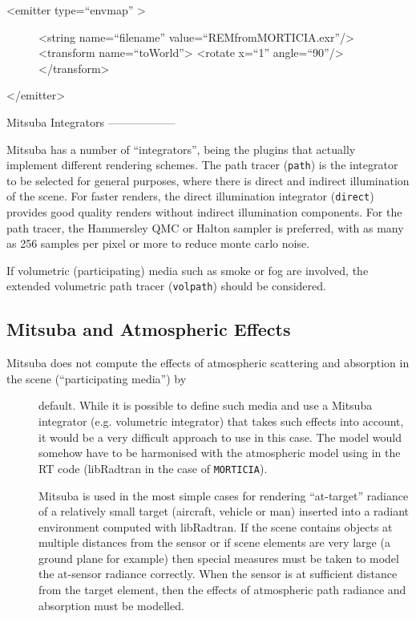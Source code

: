 \begin{description}
\item[\textless{}emitter type=``envmap'' \textgreater{}]
\textless{}string name=``filename''
value=``REMfromMORTICIA.exr''/\textgreater{} \textless{}transform
name=``toWorld''\textgreater{} \textless{}rotate x=``1''
angle=``90''/\textgreater{} \textless{}/transform\textgreater{}
\end{description}

\textless{}/emitter\textgreater{}

Mitsuba Integrators ------------------

Mitsuba has a number of ``integrators'', being the plugins that actually
implement different rendering schemes. The path tracer (\texttt{path})
is the integrator to be selected for general purposes, where there is
direct and indirect illumination of the scene. For faster renders, the
direct illumination integrator (\texttt{direct}) provides good quality
renders without indirect illumination components. For the path tracer,
the Hammersley QMC or Halton sampler is preferred, with as many as 256
samples per pixel or more to reduce monte carlo noise.

If volumetric (participating) media such as smoke or fog are involved,
the extended volumetric path tracer (\texttt{volpath}) should be
considered.

\subsection{Mitsuba and Atmospheric
Effects}\label{mitsuba-and-atmospheric-effects}

\begin{description}
\item[Mitsuba does not compute the effects of atmospheric scattering and
absorption in the scene (``participating media'') by]
default. While it is possible to define such media and use a Mitsuba
integrator (e.g. volumetric integrator) that takes such effects into
account, it would be a very difficult approach to use in this case. The
model would somehow have to be harmonised with the atmospheric model
using in the RT code (libRadtran in the case of \texttt{MORTICIA}).

Mitsuba is used in the most simple cases for rendering ``at-target''
radiance of a relatively small target (aircraft, vehicle or man)
inserted into a radiant environment computed with libRadtran. If the
scene contains objects at multiple distances from the sensor or if scene
elements are very large (a ground plane for example) then special
measures must be taken to model the at-sensor radiance correctly. When
the sensor is at sufficient distance from the target element, then the
effects of atmospheric path radiance and absorption must be modelled.
\end{description}

